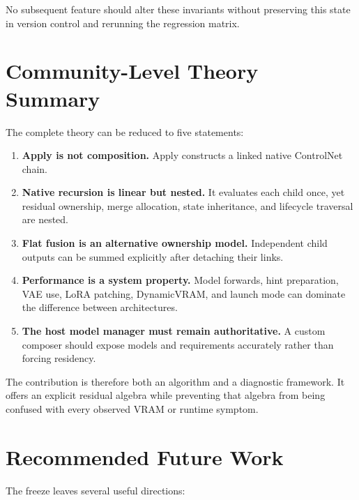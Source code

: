 \documentclass[11pt]{article}
\begin{document}
No subsequent feature should alter these invariants without preserving this state in version control and rerunning the regression matrix.

\section{Community-Level Theory Summary}

The complete theory can be reduced to five statements:

\begin{enumerate}
  \item \textbf{Apply is not composition.} Apply constructs a linked native ControlNet chain.
  \item \textbf{Native recursion is linear but nested.} It evaluates each child once, yet residual ownership, merge allocation, state inheritance, and lifecycle traversal are nested.
  \item \textbf{Flat fusion is an alternative ownership model.} Independent child outputs can be summed explicitly after detaching their links.
  \item \textbf{Performance is a system property.} Model forwards, hint preparation, VAE use, LoRA patching, DynamicVRAM, and launch mode can dominate the difference between architectures.
  \item \textbf{The host model manager must remain authoritative.} A custom composer should expose models and requirements accurately rather than forcing residency.
\end{enumerate}

The contribution is therefore both an algorithm and a diagnostic framework. It offers an explicit residual algebra while preventing that algebra from being confused with every observed VRAM or runtime symptom.

\section{Recommended Future Work}

The freeze leaves several useful directions:
\end{document}
